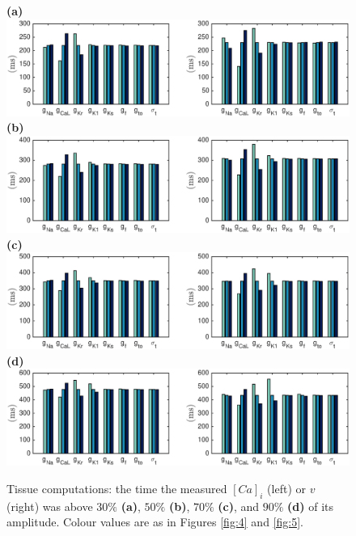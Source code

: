 \documentclass{article}
\begin{document}
\begin{figure}
 \textbf{(a)}  \includegraphics[trim=1cm 0cm 2cm 0cm, clip=true, width=1\linewidth]{30p} 
 \textbf{(b)}  \includegraphics[trim=1cm 0cm 2cm 0cm, clip=true, width=1\linewidth]{50p} 
 \textbf{(c)}   \includegraphics[trim=1cm 0cm 2cm 0cm, clip=true, width=1\linewidth]{70p} 
  \textbf{(d)}   \includegraphics[trim=1cm 0cm 2cm 0cm, clip=true, width=1\linewidth]{90p} 
    \caption{Tissue computations: the time the measured $[Ca]_i$ (left) or $v$ (right) was above $30\%$ \textbf{(a)}, $50\%$ \textbf{(b)}, $70\%$ \textbf{(c)}, and $90\%$ \textbf{(d)} of its amplitude. Colour values are as in Figures \ref{fig:4} and \ref{fig:5}.}
    \label{fig:7}
\end{figure}
%
\end{document}

